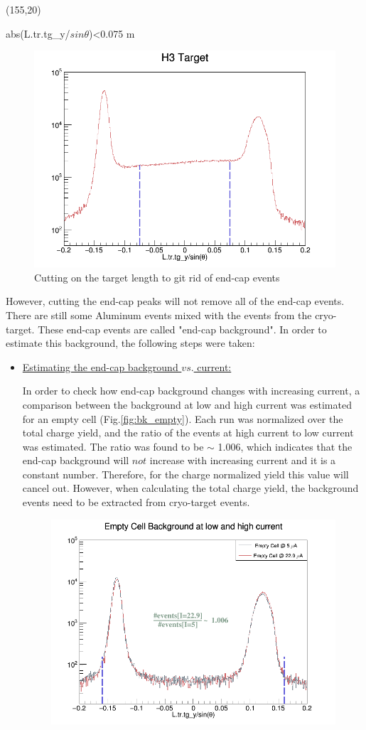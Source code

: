 \documentclass[11pt]{article}
\begin{document}
\begin{enumerate}
 \begin{center}
\framebox(155,20){%
    \parbox{150\unitlength}{abs(L.tr.tg\_y/$sin\theta$)<0.075 m}%
}
\end{center}
 \begin{figure}[H]
 \centering
 \includegraphics[width=0.6\linewidth]{y_cut.png}
  \caption{Cutting on the target length to git rid of end-cap events}
  \label{fig:ycut}
\end{figure}
However, cutting the end-cap peaks will not remove all of the end-cap events. There are still some Aluminum events mixed with the events from the cryo-target. These end-cap events are called "end-cap background". In order to estimate this background, the following steps were taken:
\clearpage
\begin{itemize}
\item{\underline{Estimating the end-cap background $vs.$ current:}  \par
 In order to check how end-cap background changes with increasing current, a comparison between the background at low and high current was estimated for an empty cell (Fig.\ref{fig:bk_empty}). Each run was normalized over the total charge yield, and the ratio of the events at high current to low current was estimated. The ratio was found to be $\sim$ 1.006, which indicates that the end-cap background will $not$ increase with increasing current and it is a constant number. Therefore, for the charge normalized yield this value will cancel out. However, when calculating the total charge yield, the background events need to be extracted from cryo-target events.}
 \begin{figure}[H]
 \centering
 \includegraphics[width=0.6\linewidth]{bk_empty.png}

\end{figure}
\end{itemize}
\end{enumerate}
\end{document}
